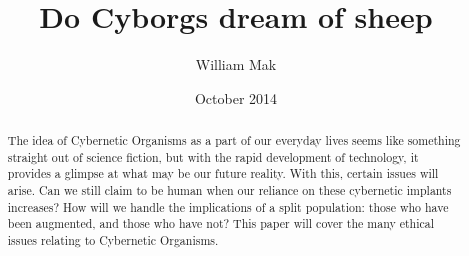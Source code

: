 \documentclass[12pt,a4paper,notitlepage]{article}
\title{Do Cyborgs dream of sheep}
\author{William Mak}
\date{October 2014}
\begin{document}
\maketitle
\begin{abstract}
The idea of Cybernetic Organisms as a part of our everyday lives seems like
something straight out of science fiction, but with the rapid development of
technology, it provides a glimpse at what may be our future reality. With this,
certain issues will arise. Can we still claim to be human when our reliance on
these cybernetic implants increases? How will we handle the implications of a
split population: those who have been augmented, and those who have not? This
paper will cover the many ethical issues relating to Cybernetic Organisms.
\end{abstract}
\end{document}
